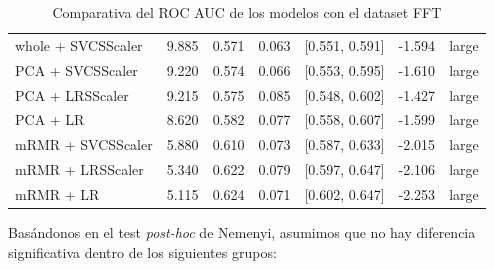 \documentclass[a4paper,oneside,11pt,leqno]{article}
\begin{document}
\begin{table}[h]
\begin{tabular}{lrrrlll}
			whole + SVCSScaler &  9.885 & 0.571 & 0.063 &  [0.551, 0.591] & -1.594 &       large \\
			PCA + SVCSScaler   &  9.220 & 0.574 & 0.066 &  [0.553, 0.595] & -1.610 &       large \\
			PCA + LRSScaler    &  9.215 & 0.575 & 0.085 &  [0.548, 0.602] & -1.427 &       large \\
			PCA + LR           &  8.620 & 0.582 & 0.077 &  [0.558, 0.607] & -1.599 &       large \\
			mRMR + SVCSScaler  &  5.880 & 0.610 & 0.073 &  [0.587, 0.633] & -2.015 &       large \\
			mRMR + LRSScaler   &  5.340 & 0.622 & 0.079 &  [0.597, 0.647] & -2.106 &       large \\
			mRMR + LR          &  5.115 & 0.624 & 0.071 &  [0.602, 0.647] & -2.253 &       large \\
			\bottomrule
		\end{tabular}
		\caption{Comparativa del ROC AUC de los modelos con el dataset FFT}
		\label{tab:stat_results_fft}
	\end{table}
	
	Basándonos en el test \textit{post-hoc} de Nemenyi, asumimos que no hay diferencia significativa dentro de los siguientes grupos:
	
\end{document}
